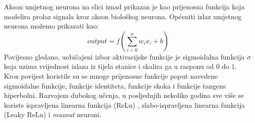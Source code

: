 \documentclass[times, utf8, diplomski]{fer}
\theoremstyle{definition}
\begin{document}
Akson umjetnog neurona na slici iznad prikazan je kao prijenosna funkcija  koja modelira prolaz signala kroz akson biološkog neurona. Općeniti izlaz umjetnog neurona možemo prikazati kao:
\begin{equation}
output = f(\sum_{i=0}^{n}w_ix_i + b)
\end{equation}
Povijesno gledano, uobičajeni izbor aktivacijske funkcije je sigmoidalna funkcija $\sigma$ koja uzima vrijednost izlaza iz tijela stanice i skalira ga u rasponu od $0$ do $1$. Kroz povijest koristile su se mnoge prijenosne funkcije poput  navedene sigmoidalne funkcije, funkcije identiteta, funkcije skoka i funkcije tangens hiperbolni. Razvojem dubokog učenja, u posljednjih nekoliko godina sve više se koriste ispravljena linearna funkcija (ReLu) , slabo-ispravljena linearna funkcija (Leaky ReLu)  i \textit{maxout} neuroni.
\end{document}
